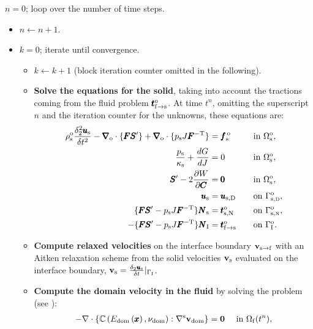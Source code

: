 \documentclass[11pt,english]{article}
\def\usolid{\pmb{u}_{\rm{s}}}                   %
\def\psolid{p_{\rm{s}}}                         %
\def\devPK{\pmb{S}^\prime}                      %
\def\F{\pmb{F}}                             %
\def\C{\pmb{C}}                             %
\def\invFtrans{\pmb{F}^{-\rm{T}}}           %
\def\dGdJ{\frac{dG}{dJ}}                    %
\def\dWdC{\frac{\partial W}{\partial \C}}   %
\def\vsolid{\vb{v}_{\rm{s}}}               %
\def\domainsolidreference{\Omega_{\rm{s}}^{\rm{o}}}  %
\def\boundarysolidDirichlet{\Gamma_{\rm{s,\scriptscriptstyle \rm{D}}}^{\rm{o}}} %
\def\boundarysolidNeumann{\Gamma_{\rm{s}, \scriptscriptstyle \rm{N}}^{\rm{o}}} %
\def\Normal{\pmb{N}_{\rm{s}}}                       %
\def\usolidDir{\pmb{u}_{\rm{s},\rm{D}}}                    %
\def\reftract{\pmb{t}_{\rm{s},\rm{N}}^{\rm{o}}}            %
\def\bodyfsolid{\pmb{f}_{\rm{s}}^{\,\rm{o}}}        %
\def\grad{\pmb{\nabla}_{\rm{o}}}        %
\def\div{\grad \cdot}                   %
\def\denssolid{\rho_{\rm{s}}^{\rm{o}}}  %
\def\kappasolid{\kappa_{\rm{s}}}        %
\def\vfluiddom{\vb{v}_{\mathrm{dom}}}      %
\def\boundaryFSI{\Gamma_{\rm{I}}}
\def\boundaryFSIreference{\Gamma_{\rm{I}}^{\rm{o}}}
\def\FSItract{\pmb{t}_{\rm{f}\to{\rm{s}}}}
\def\FSItractref{\FSItract^{\rm{o}}}
\def\NormalFSI{\pmb{N}_{\rm{I}}}
\def\vboundaryFSI{\vb{v}_{\rm{s}\to{\rm{f}}}}
\def\BDFdudt2{\frac{\delta_2^2 \usolid}{\delta t^2}}    %
\begin{document}
\begin{algorithm}
\footnotesize
\caption{FSI algorithm}\label{alg:algorithm1}
$n = 0$; loop over the number of time steps.
\begin{itemize}
\item[] $n \gets n + 1$.
\item [] $k=0$; iterate until convergence.
\begin{itemize}
 \item[] $k \gets k + 1$ (block iteration counter omitted in the following).
 \item[$\bullet$] {\bf Solve the equations for the solid}, taking into account the tractions coming from the fluid problem $\FSItractref$. At time $t^n$, omitting the superscript $n$ and the iteration counter for the unknowns, these equations are:
 \begin{align*}
    \denssolid \BDFdudt2 - \div \lbrace \F \devPK \rbrace + \div \lbrace \psolid J \invFtrans \rbrace &= \bodyfsolid \quad && \hbox{in}~\domainsolidreference, \\
     \frac{\psolid}{\kappasolid} + \dGdJ &= 0 \quad && \hbox{in}~\domainsolidreference, \\
     \devPK - 2\dWdC &= \pmb{0} \quad && \hbox{in}~\domainsolidreference, \\
     \usolid &= \usolidDir \quad && \hbox{on}~\boundarysolidDirichlet,\\
     \lbrace \F \devPK - \psolid J \invFtrans \rbrace \Normal &= \reftract \quad && \hbox{on}~\boundarysolidNeumann, \\
     - \lbrace \F \devPK - \psolid J \invFtrans \rbrace \NormalFSI &= \FSItractref \quad && \hbox{on}~\boundaryFSIreference.
 \end{align*}
 \item[$\bullet$] {\bf Compute relaxed velocities} on the interface boundary $\vboundaryFSI$ with an Aitken relaxation scheme from the solid velocities
     $\vsolid$ evaluated on the interface boundary, $ \vsolid = \frac{\delta_2 \usolid}{\delta t}\vert_{\boundaryFSI}$.
 \item[$\bullet$] {\bf Compute the domain velocity in the fluid} by solving the problem (see \cite{Mesh}):
  \begin{align*}
    -\nabla \cdot \left \lbrace \mathbb{C} \left(E_{\mathrm{dom}}\left( \pmb{x}\right),\nu_{\mathrm{dom}} \right) : \nabla^{\rm s}\vfluiddom \right \rbrace &={\bf 0} && \text{ in } \ensuremath{\Omega}_{\rm{f}}(t^n),\\

\end{align*}
\end{itemize}
\end{itemize}
\end{algorithm}
\end{document}

